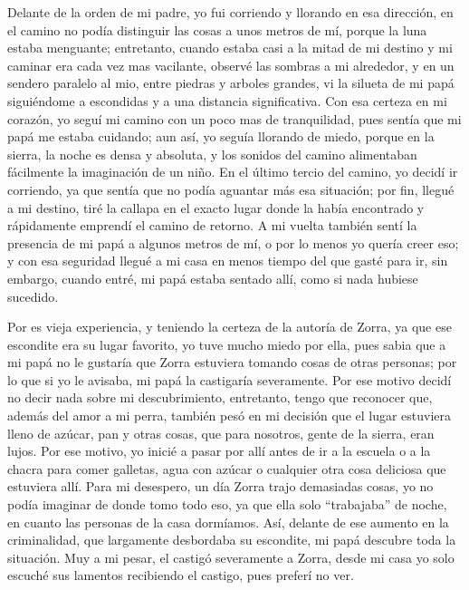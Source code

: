 Delante de la orden de mi padre, yo fui corriendo y llorando en esa dirección, en el camino no podía distinguir las cosas a unos metros de mí, porque la luna estaba menguante; entretanto, cuando estaba casi a la mitad de mi destino y mi caminar era cada vez mas vacilante, observé las sombras a mi alrededor, y en un sendero paralelo al mio, entre piedras y arboles grandes, vi la silueta de mi papá siguiéndome a escondidas y a una distancia significativa.
Con esa certeza en mi corazón, yo seguí mi camino con un poco mas de tranquilidad, pues sentía que mi papá me estaba cuidando; aun así, yo seguía llorando de miedo, porque en la sierra, la noche es densa y absoluta, y los sonidos del camino alimentaban fácilmente la imaginación de un niño.
En el último tercio del camino, yo decidí ir corriendo, ya que sentía que no podía aguantar más esa situación; por fin, llegué a mi destino, tiré la callapa en el exacto lugar donde la había encontrado y rápidamente emprendí el camino de retorno.
A mi vuelta también sentí la presencia de mi papá a algunos metros de mí, o por lo menos yo quería creer eso; y con esa seguridad llegué a mi casa en menos tiempo del que gasté para ir, sin embargo, cuando entré, mi papá estaba sentado allí, como si nada hubiese sucedido.

Por es vieja experiencia, y teniendo la certeza de la autoría de Zorra, ya que ese escondite era su lugar favorito, yo tuve mucho miedo por ella, pues sabia que a mi papá no le gustaría que Zorra estuviera tomando cosas de otras personas; por lo que si yo le avisaba, mi papá la castigaría severamente. Por ese motivo decidí no decir nada sobre mi descubrimiento, entretanto, tengo que reconocer que, además del amor a mi perra, también pesó en mi decisión que el lugar estuviera lleno de azúcar, pan y otras cosas, que para nosotros, gente de la sierra, eran lujos.
Por ese motivo, yo inicié a pasar por allí antes de ir a la escuela o a la chacra para comer galletas, agua con azúcar o cualquier otra cosa deliciosa que estuviera allí.
Para mi desespero, un día Zorra trajo demasiadas cosas, yo no podía imaginar de donde tomo todo eso, ya que ella solo ``trabajaba'' de noche, en cuanto las personas de la casa dormíamos. Así, delante de ese aumento en la criminalidad, que largamente desbordaba su escondite, mi papá descubre toda la situación.
Muy a mi pesar, el castigó severamente a Zorra, desde mi casa yo solo escuché sus lamentos recibiendo el castigo, pues preferí no ver.


